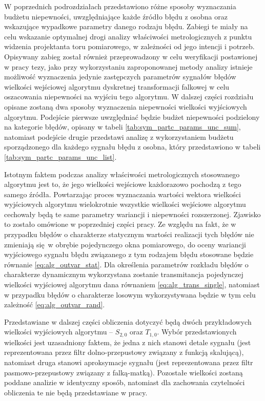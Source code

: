 W poprzednich podrozdziałach przedstawiono różne sposoby wyznaczania budżetu niepewności, uwzględniające każde źródło błędu z osobna oraz wskazujące wypadkowe parametry danego rodzaju błędu. Zabiegi te miały na celu wskazanie optymalnej drogi analizy właściwości metrologicznych z punktu widzenia projektanta toru pomiarowego, w zależności od jego intencji i potrzeb. Opisywany zabieg został również przeprowadzony w celu weryfikacji postawionej w pracy tezy, jako przy wykorzystaniu zaproponowanej metody analizy istnieje możliwość wyznaczenia jedynie zastępczych parametrów sygnałów błędów wielkości wejściowej algorytmu dyskretnej transformacji falkowej w celu oszacowania niepewności na wyjściu tego algorytmu. W dalszej części rozdziału opisane zostaną dwa sposoby wyznaczenia niepewności wielkości wyjściowych algorytmu. Podejście pierwsze uwzględniać będzie budżet niepewności podzielony na kategorie błędów, opisany w tabeli \ref{tab:sym_partc_params_unc_sum}, natomiast podejście drugie przedstawi analizę z wykorzystaniem budżetu sporządzonego dla każdego sygnału błędu z osobna, który przedstawiono w tabeli \ref{tab:sym_partc_params_unc_list}.

Istotnym faktem podczas analizy właściwości metrologicznych stosowanego algorytmu jest to, że jego wielkości wejściowe każdorazowo pochodzą z tego samego źródła. Powtarzając proces wyznaczania wartości wektora wielkości wyjściowych algorytmu wielokrotnie wszystkie wielkości wejściowe algorytmu cechowały będą te same parametry wariancji i niepewności rozszerzonej. Zjawisko to zostało omówione w poprzedniej części pracy. Ze względu na fakt, że w przypadku błędów o charakterze statycznym wartości realizacji tych błędów nie zmieniają się w obrębie pojedynczego okna pomiarowego, do oceny wariancji wyjściowego sygnału błędu związanego z tym rodzajem błędu stosowane będzie równanie \eqref{eq:alg_outvar_stat}. Dla określenia parametrów rozkładu błędów o charakterze dynamicznym wykorzystana zostanie transmitancja pojedynczej wielkości wyjściowej algorytmu dana równaniem \eqref{eq:alg_trans_single}, natomiast w przypadku błędów o charakterze losowym wykorzystywana będzie w tym celu zależność \eqref{eq:alg_outvar_rand}.

Przedstawiane w dalszej części obliczenia dotyczyć będą dwóch przykładowych wielkości wyjściowych algorytmu -- $S_{2,0}$ oraz $T_{1,0}$. Wybór przedstawionych wielkości jest uzasadniony faktem, że jedna z nich stanowi detale sygnału (jest reprezentowana przez filtr dolno-przepustowy związany z funkcją skalującą), natomiast druga stanowi aproksymacje sygnału (jest reprezentowana przez filtr pasmowo-przepustowy związany z falką-matką). Pozostałe wielkości zostaną poddane analizie w identyczny sposób, natomiast dla zachowania czytelności obliczenia te nie będą przedstawiane w pracy.

